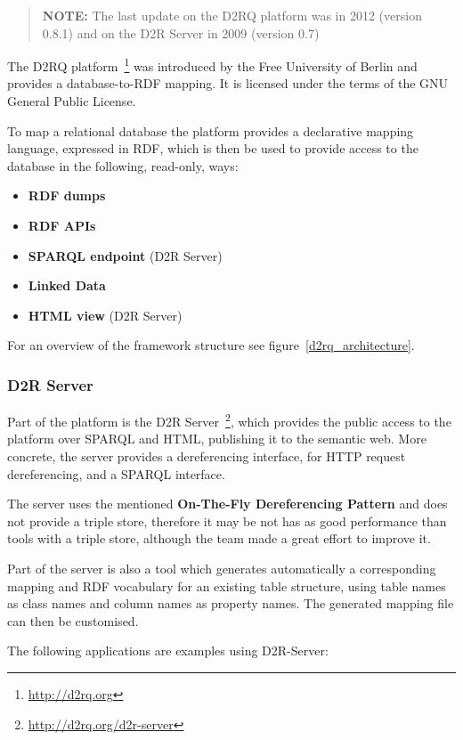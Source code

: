 \begin{verse}
\textbf{NOTE:} The last update on the D2RQ platform was in 2012 (version 0.8.1) and on the D2R Server in 2009 (version 0.7)
\end{verse}

The D2RQ platform~\footnote{\url{http://d2rq.org}} was introduced by the Free University of Berlin and provides a database-to-RDF mapping. It is licensed under the terms of the GNU General Public License. 

To map a relational database the platform provides a declarative mapping language, expressed in RDF, which is then be used to provide access to the database in the following, read-only, ways:~\cite{d2rq:w3c}

\begin{itemize}
\item \textbf{RDF dumps}
\item \textbf{RDF APIs}
\item \textbf{SPARQL endpoint} (D2R Server)
\item \textbf{Linked Data}
\item \textbf{HTML view} (D2R Server)
\end{itemize}

For an overview of the framework structure see figure~\ref{d2rq_architecture}.

\subsubsection{D2R Server}
Part of the platform is the D2R Server~\footnote{\url{http://d2rq.org/d2r-server}}, which provides the public access to the platform over SPARQL and HTML, publishing it to the semantic web. More concrete, the server provides a dereferencing interface, for HTTP request dereferencing, and a SPARQL interface. 

The server uses the mentioned \textbf{On-The-Fly Dereferencing Pattern} and does not provide a triple store, therefore it may be not has as good performance than tools with a triple store, although the team made a great effort to improve it.

Part of the server is also a tool which generates automatically a corresponding mapping and RDF vocabulary for an existing table structure, using table names as class names and column names as property names. The generated mapping file can then be customised.~\cite{bizer2006d2r}

The following applications are examples using D2R-Server:

